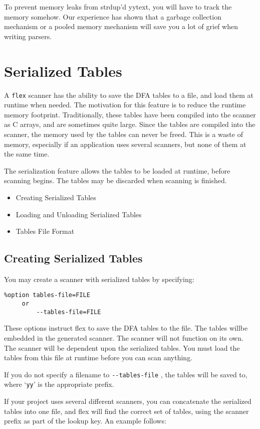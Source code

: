 \documentclass[openany,oneside]{book}
\begin{document}
To prevent memory leaks from strdup'd yytext, you will have to track the memory
somehow. Our experience has shown that a garbage collection mechanism or a
pooled memory mechanism will save you a lot of grief when writing parsers.
\chapter{Serialized Tables}


A \verb`flex` scanner has the ability to save the DFA tables to a file, and
load them at runtime when needed.  The motivation for this feature is to reduce
the runtime memory footprint.  Traditionally, these tables have been compiled into
the scanner as C arrays, and are sometimes quite large.  Since the tables are
compiled into the scanner, the memory used by the tables can never be freed. 
This is a waste of memory, especially if an application uses several scanners,
but none of them at the same time.

The serialization feature allows the tables to be loaded at runtime, before
scanning begins. The tables may be discarded when scanning is finished.
\begin{itemize}
\item Creating Serialized Tables
\item Loading and Unloading Serialized Tables
\item Tables File Format
\end{itemize}

\section{Creating Serialized Tables}


You may create a scanner with serialized tables by specifying:
\begin{verbatim}
%option tables-file=FILE
     or
         --tables-file=FILE
\end{verbatim}


These options instruct flex to save the DFA tables to the file. The tables
willbe embedded in the generated scanner. The scanner will not
function on its own. The scanner will be dependent upon the serialized tables. You must
load the tables from this file at runtime before you can scan anything.

If you do not specify a filename to \verb`--tables-file` , the tables will be
saved to, where ‘\verb`yy`’ is the appropriate prefix.

If your project uses several different scanners, you can concatenate the
serialized tables into one file, and flex will find the correct set of tables,
using the scanner prefix as part of the lookup key. An example follows:
\end{document}
